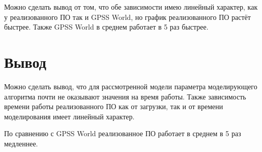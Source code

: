 \FloatBarrier

Можно сделать вывод от том, что обе зависимости имею линейный характер, как у реализованного ПО так и GPSS World, но график реализованного ПО растёт быстрее. Также GPSS World в среднем работает в 5 раз быстрее.

\section{Вывод}

Можно сделать вывод, что для рассмотренной модели параметра моделирующего алгоритма почти не оказывают значения на время работы. Также зависимость времени работы реализованного ПО как от загрузки, так и от времени моделирования имеет линейный характер.

По сравнению с GPSS World реализованное ПО работает в среднем в 5 раз медленнее.